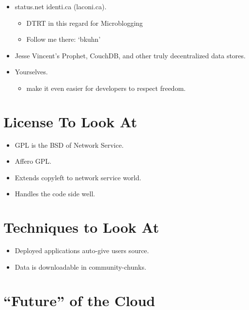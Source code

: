 \documentclass{article}
\begin{document}
\begin{itemize}
\item 
  status.net identi.ca (laconi.ca).
  \begin{itemize}
  \item 
    DTRT in this regard for Microblogging
  \item 
    Follow me there: `bkuhn'
  \end{itemize}
\item 
  Jesse Vincent's Prophet, CouchDB, and other truly decentralized
  data stores.

\item 
  Yourselves.
  \begin{itemize}
  \item 
    make it even easier for developers to respect freedom.
  \end{itemize}
\end{itemize}
\section{License To Look At}

\begin{itemize}
\item 
  GPL is the BSD of Network Service.

\item 
  Affero GPL.

\item 
  Extends copyleft to network service world.

\item 
  Handles the code side well.

\end{itemize}
\section{Techniques to Look At}

\begin{itemize}
\item 
  Deployed applications auto-give users source.

\item 
  Data is downloadable in community-chunks.

\end{itemize}
\section{``Future'' of the Cloud}
\end{document}
